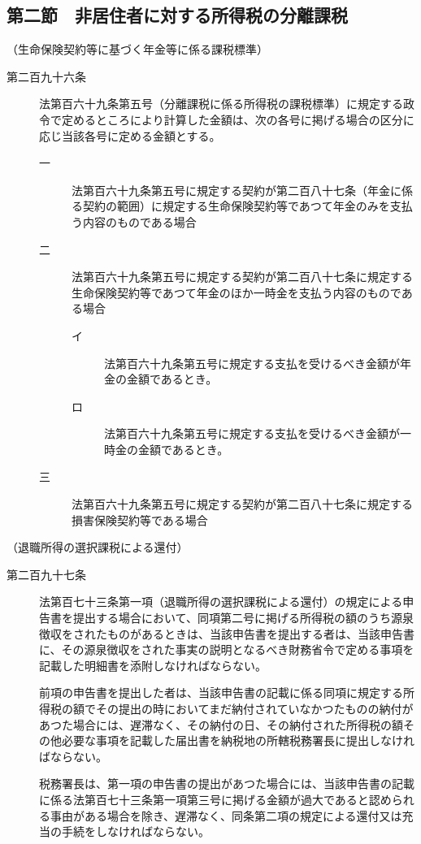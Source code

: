 \documentclass[twocolumn,a4j,10pt]{ltjtarticle}
\begin{document}
\subsection*{第二節　非居住者に対する所得税の分離課税}
\noindent\hspace{10pt}（生命保険契約等に基づく年金等に係る課税標準）
\begin{description}
\item[第二百九十六条]法第百六十九条第五号（分離課税に係る所得税の課税標準）に規定する政令で定めるところにより計算した金額は、次の各号に掲げる場合の区分に応じ当該各号に定める金額とする。
\begin{description}
\item[一]法第百六十九条第五号に規定する契約が第二百八十七条（年金に係る契約の範囲）に規定する生命保険契約等であつて年金のみを支払う内容のものである場合
\item[二]法第百六十九条第五号に規定する契約が第二百八十七条に規定する生命保険契約等であつて年金のほか一時金を支払う内容のものである場合
\begin{description}
\item[イ]法第百六十九条第五号に規定する支払を受けるべき金額が年金の金額であるとき。
\item[ロ]法第百六十九条第五号に規定する支払を受けるべき金額が一時金の金額であるとき。
\end{description}
\item[三]法第百六十九条第五号に規定する契約が第二百八十七条に規定する損害保険契約等である場合
\end{description}
\end{description}
\noindent\hspace{10pt}（退職所得の選択課税による還付）
\begin{description}
\item[第二百九十七条]法第百七十三条第一項（退職所得の選択課税による還付）の規定による申告書を提出する場合において、同項第二号に掲げる所得税の額のうち源泉徴収をされたものがあるときは、当該申告書を提出する者は、当該申告書に、その源泉徴収をされた事実の説明となるべき財務省令で定める事項を記載した明細書を添附しなければならない。
\item[]前項の申告書を提出した者は、当該申告書の記載に係る同項に規定する所得税の額でその提出の時においてまだ納付されていなかつたものの納付があつた場合には、遅滞なく、その納付の日、その納付された所得税の額その他必要な事項を記載した届出書を納税地の所轄税務署長に提出しなければならない。
\item[]税務署長は、第一項の申告書の提出があつた場合には、当該申告書の記載に係る法第百七十三条第一項第三号に掲げる金額が過大であると認められる事由がある場合を除き、遅滞なく、同条第二項の規定による還付又は充当の手続をしなければならない。
\end{description}
\end{document}
